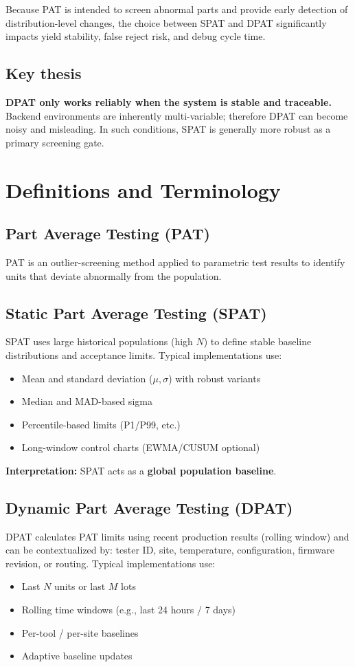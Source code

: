 \documentclass[11pt,a4paper]{article}
\begin{document}
	Because PAT is intended to screen abnormal parts and provide early detection of distribution-level changes,
	the choice between SPAT and DPAT significantly impacts yield stability, false reject risk, and debug cycle time.
	
	\subsection{Key thesis}
	\textbf{DPAT only works reliably when the system is stable and traceable.}
	Backend environments are inherently multi-variable; therefore DPAT can become noisy and misleading.
	In such conditions, SPAT is generally more robust as a primary screening gate.
	
	\section{Definitions and Terminology}
	
	\subsection{Part Average Testing (PAT)}
	PAT is an outlier-screening method applied to parametric test results to identify units that deviate
	abnormally from the population.
	
	\subsection{Static Part Average Testing (SPAT)}
	SPAT uses large historical populations (high $N$) to define stable baseline distributions and acceptance limits.
	Typical implementations use:
	\begin{itemize}[leftmargin=1.2em]
		\item Mean and standard deviation ($\mu, \sigma$) with robust variants
		\item Median and MAD-based sigma
		\item Percentile-based limits (P1/P99, etc.)
		\item Long-window control charts (EWMA/CUSUM optional)
	\end{itemize}
	
	\textbf{Interpretation:} SPAT acts as a \textbf{global population baseline}.
	
	\subsection{Dynamic Part Average Testing (DPAT)}
	DPAT calculates PAT limits using recent production results (rolling window) and can be contextualized by:
	tester ID, site, temperature, configuration, firmware revision, or routing. Typical implementations use:
	\begin{itemize}[leftmargin=1.2em]
		\item Last $N$ units or last $M$ lots
		\item Rolling time windows (e.g., last 24 hours / 7 days)
		\item Per-tool / per-site baselines
		\item Adaptive baseline updates
	\end{itemize}
	
\end{document}
